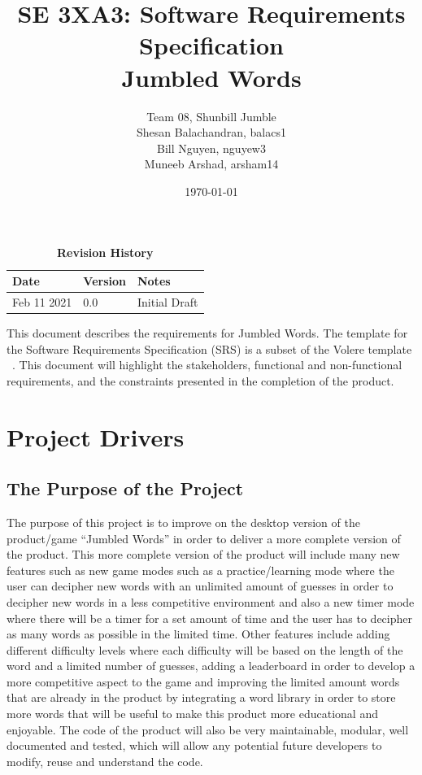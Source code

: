 \documentclass[12pt, titlepage]{article}
\title{SE 3XA3: Software Requirements Specification\\Jumbled Words}
\author{Team 08, Shunbill Jumble
	\\Shesan Balachandran, balacs1
	\\Bill Nguyen, nguyew3
	\\Muneeb Arshad, arsham14
}
\date{\today}
\begin{document}
	

\maketitle

\tableofcontents
\listoftables
\listoffigures

\newpage
\begin{table}[bp]
\caption{\bf Revision History}
\begin{tabularx}{\textwidth}{p{3cm}p{2cm}X}
\toprule {\bf Date} & {\bf Version} & {\bf Notes}\\
\midrule
Feb 11 2021 & 0.0 & Initial Draft\\
\bottomrule
\end{tabularx}
\end{table}

\clearpage




This document describes the requirements for Jumbled Words. The template for the Software
Requirements Specification (SRS) is a subset of the Volere
template ~\citep{RobertsonAndRobertson2012}. This document will highlight the stakeholders, functional and non-functional requirements, and the constraints presented in the completion of the product.

\section{Project Drivers}

\subsection{The Purpose of the Project}

The purpose of this project is to improve on the desktop version of the product/game “Jumbled Words” in order to deliver a more complete version of the product. This more complete version of the product will include many new features such as new game modes such as a practice/learning mode where the user can decipher new words with an unlimited amount of guesses in order to decipher new words in a less competitive environment and also a new timer mode where there will be a timer for a set amount of time and the user has to decipher as many words as possible in the limited time. Other features include adding different difficulty levels where each difficulty will be based on the length of the word and a limited number of guesses, adding a leaderboard in order to develop a more competitive aspect to the game and improving the limited amount words that are already in the product by integrating a word library in order to store more words that will be useful to make this product more educational and enjoyable. The code of the product will also be very maintainable, modular, well documented and tested, which will allow any potential future developers to modify, reuse and understand the code.
\end{document}
